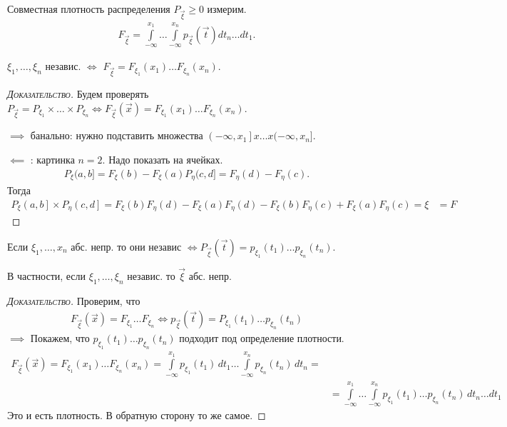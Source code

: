 \begin{df}
 Совместная плотность распределения $ P_{\vec\xi} \geqslant 0 $  измерим.
 \begin{align*}
  F_{\vec\xi} = \int\limits_{-\infty}^{x_1}  \ldots \int\limits_{-\infty}^{x_n} p_{\vec\xi}(\vec t) dt_n \ldots dt_1.
 \end{align*} 
\end{df}
\begin{сrly}
 $ \xi_1, \ldots, \xi_n $ независ. $ \iff $ $ F_{\vec\xi} = F_{\xi_1}(x_1) \ldots F_{\xi_n}(x_n) $.
\end{сrly}
\begin{proof}[\normalfont\textsc{Доказательство}]
 Будем проверять $ P_{\vec\xi} = P_{\xi_1} \times \ldots \times P_{\xi_n} \iff F_{\vec\xi}(\vec x) = F_{\xi_1}(x_1) \ldots F_{\xi_n}(x_n) $.

 $ \implies $  банально: нужно подставить множества $ \left(-\infty, x_1\right] x \ldots x (-\infty, x_n]   $.

 $ \impliedby $ : картинка $ n=2 $. Надо показать на ячейках. 
 \begin{align*}
  P_{\xi} (a,b] = F_{\xi}(b) - F_{\xi}(a)
  P_{\eta} (c,d] = F_{\eta}(d) - F_{\eta}(c).
 \end{align*} Тогда
 \begin{align*}
  P_{\xi} \left(a, b\right] \times P_{\eta}  \left(c, d\right] = F_{\xi}(b) F_{\eta}(d) - F_{\xi}(a) F_{\eta}(d) - F_{\xi}(b) F_{\eta}(c) + F_{\xi}(a) F_{\eta}(c) = \xi
  &= F_{}
 \end{align*}

\end{proof}
\begin{сrly}
 Если $ \xi_1, \ldots, x_n $ абс. непр. то они независ $ \iff P_{\vec\xi}(\vec t) = p_{\xi_1}(t_1) \ldots p_{\xi_n}(t_n) $.

 В частности, если $ \xi_1, \ldots, \xi_n $ независ. то $ \vec\xi $ абс. непр.
\end{сrly}
\begin{proof}[\normalfont\textsc{Доказательство}]
 Проверим, что
 \begin{align*}
  F_{\vec\xi}(\vec x) = F_{\xi_1} \ldots F_{\xi_n} \iff p_{\vec\xi}(\vec t) = P_{\xi_1}(t_1) \ldots p_{\xi_n}(t_n)
 \end{align*}
 $ \implies $ Покажем, что $ p_{\xi_1}(t_1) \ldots p_{\xi_n}(t_n) $ подходит под определение плотности.
 \begin{align*}
  F_{\vec\xi}(\vec x) = F_{\xi_1}(x_1) \ldots F_{\xi_n}(x_n) = \int\limits_{-\infty}^{x_1} p_{\xi_1}(t_1)\,dt_1 \ldots \int\limits_{-\infty}^{x_n} p_{\xi_n}(t_n)\,dt_n = \\
  &= \int\limits_{-\infty}^{x_1} \ldots \int\limits_{-\infty}^{x_n} p_{\xi_1}(t_1) \ldots p_{\xi_n}(t_n)\,dt_n\ldots dt_1
 \end{align*} Это и есть плотность. В обратную сторону то же самое.
\end{proof}

